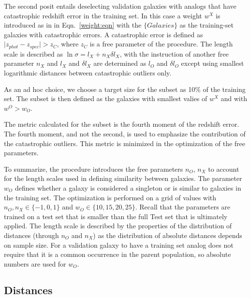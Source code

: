 \documentclass[preprint]{aastex}
\providecommand{\abs}[1]{\lvert#1\rvert}
\begin{document}
The second posit entails deselecting validation galaxies with analogs that have catastrophic redshift error
in the training set.  In this case a weight $w^X$ is introduced as in in Eqn.\ \ref{weight:eqn}  with the $\{Galaxies\}$
as the training-set galaxies with catastrophic errors.  A catastrophic error is
defined as $\abs{z_{phot}-z_{spec}}> z_C$, where $z_C$ is a free parameter of the procedure.
The length scale is described as $\ln{\sigma} = l_X +
n_X\delta l_X$, with the instruction of another free parameter $n_X$ and
$l_X$ and $\delta l_X$ are determined as  $l_O$ and $\delta l_O$
except using smallest logarithmic distances between catastrophic outliers only.

As an ad hoc choice, we choose a target size for the subset as 10\% of the training set.
The subset is then defined as the galaxies with smallest valies of $w^X$ and with  $w^O>w_O$.

The metric calculated for the subset is the fourth moment of the redshift error. The fourth moment, and not the
second, is used to emphasize the contribution of the catastrophic outliers.  This metric is minimized
in the optimization of the free parameters.

To summarize, the procedure introduces the free parameters $n_O$, $n_X$ to account for the length scales
used in defining similarity between galaxies.  
The parameter $w_O$ defines whether a galaxy is considered
a singleton or is similar to galaxies in the training set.
The optimization is performed on a grid of values with $n_O, n_X \in \{-1,0,1\}$ and $w_O \in \{10,15,20,25\}$.
Recall that the parameters are trained on a test set that is smaller than the full Test set that is ultimately applied.
The length scale is described by the properties of the distribution of distances (through  $n_O$ and $n_X$)
as the distribution of absolute distances depends on sample size.
For a validation galaxy to have a training set analog does not require that it is a common occurrence in the
parent population, so absolute numbers are used for $w_O$.

\subsection{Distances}

\end{document}
